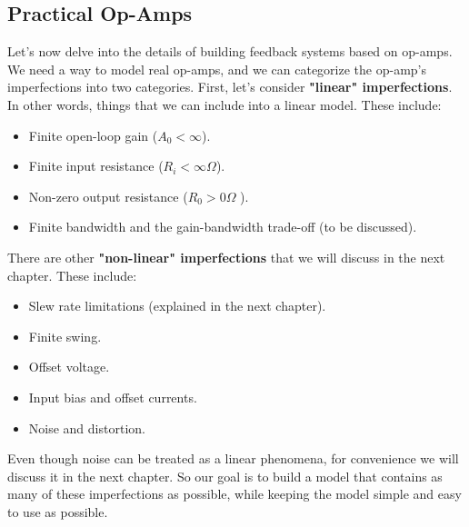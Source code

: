 \subsection{Practical Op-Amps}
Let's now delve into the details of building feedback systems based on op-amps.  We need a way to model real op-amps, and we can categorize the op-amp's imperfections into two categories.  First, let's consider \textbf{"linear" imperfections}. In other words, things that we can include into a linear model.  These include:
    \begin{itemize}[topsep=8pt,itemsep=4pt,partopsep=4pt, parsep=4pt]
        \item{Finite open-loop gain ($A_0 < \infty$).}
        \item{Finite input resistance ($R_i < \infty\Omega$).}
     	\item{Non-zero output resistance ($R_0 > 0\Omega$ ).}
     	\item{ Finite bandwidth and the gain-bandwidth trade-off (to be discussed).}
    \end{itemize}
There are other \textbf{"non-linear" imperfections} that we will discuss in the next chapter.  These include:
    \begin{itemize}[topsep=8pt,itemsep=4pt,partopsep=4pt, parsep=4pt]
        \item{Slew rate limitations (explained in the next chapter).}
        \item{Finite swing.}
        \item{Offset voltage.}
        \item{Input bias and offset currents.}
        \item{Noise and distortion.}
    \end{itemize}
Even though noise can be treated as a linear phenomena, for convenience we will discuss it in the next chapter.  So our goal is to build a model that contains as many of these imperfections as possible, while keeping the model simple and easy to use as possible.
